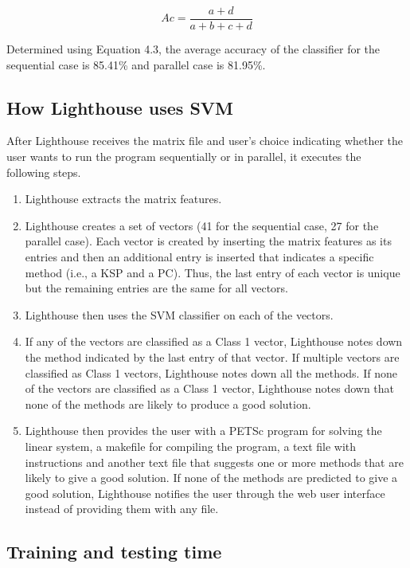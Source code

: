\begin{equation}
  Ac = \frac{a+d}{a+b+c+d}
\end{equation}

\noindent Determined using Equation 4.3, the average accuracy of the classifier for the sequential case is 85.41\% and parallel case is 81.95\%.

\subsection{How Lighthouse uses SVM}

After Lighthouse receives the matrix file and user's choice indicating whether the user wants to run the program sequentially or in parallel, it executes the following steps.

\begin{enumerate}
\item Lighthouse extracts the matrix features.
\item Lighthouse creates a set of vectors (41 for the sequential case, 27 for the parallel case). Each vector is created by inserting the matrix features as its entries and then an additional entry is inserted that indicates a specific method (i.e., a KSP and a PC). Thus, the last entry of each vector is unique but the remaining entries are the same for all vectors.
\item Lighthouse then uses the SVM classifier on each of the vectors.
\item If any of the vectors are classified as a Class 1 vector, Lighthouse notes down the method indicated by the last entry of that vector. If multiple vectors are classified as Class 1 vectors, Lighthouse notes down all the methods. If none of the vectors are classified as a Class 1 vector, Lighthouse notes down that none of the methods are likely to produce a good solution.
\item Lighthouse then provides the user with a PETSc program for solving the linear system, a makefile for compiling the program, a text file with instructions and another text file that suggests one or more methods that are likely to give a good solution. If none of the methods are predicted to give a good solution, Lighthouse notifies the user through the web user interface instead of providing them with any file.
\end{enumerate}

\subsection{Training and testing time}

